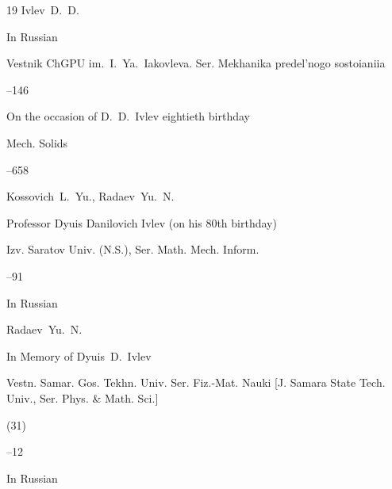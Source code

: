 \begin{thebibliography}{19}
\by Ivlev~D.~D.

\lang In Russian

\jour Vestnik \mbox{ChGPU} im.~I.~Ya.~Iakovleva. Ser. Mekhanika predel'nogo sostoianiia



--146





\paper On the occasion of D.~D.~Ivlev eightieth birthday

\jour Mech. Solids




–658





\by Kossovich~L.~Yu., Radaev~Yu.~N.

\paper Professor Dyuis Danilovich Ivlev (on his 80th birthday)

\jour Izv. Saratov Univ. (N.S.), Ser. Math. Mech. Inform.




--91







\lang In Russian

\by Radaev~Yu.~N.

\paper In Memory of Dyuis~D.~Ivlev

\serial Vestn. Samar. Gos. Tekhn. Univ. Ser. Fiz.-Mat. Nauki \rm [J. Samara State Tech. Univ., Ser. Phys. \& Math. Sci.]


(31)

--12







\lang In Russian


\end{thebibliography}
